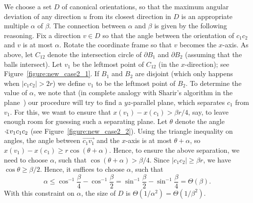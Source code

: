 \documentclass[a4paper,12pt]{article}
\def\bd{{\partial}}
\begin{document}
\smallskip
{} We
choose a set $D$ of canonical orientations, so that the maximum
angular deviation of any direction $u$ from its closest direction in
$D$ is an appropriate multiple $\alpha$ of $\beta$. The connection
between $\alpha$ and $\beta$ is given by the following reasoning.
Fix a direction $v \in D$ so that the angle between the orientation
of $c_1 c_2$ and $v$ is at most $\alpha$. Rotate the coordinate
frame so that $v$ becomes the $x$-axis. As above, let $C_{12}$
denote the intersection circle of $\bd{B_1}$ and $\bd{B_2}$
(assuming that the balls intersect). Let $v_1$ be the leftmost point
of $C_{12}$ (in the $x$-direction); see
Figure~\ref{figure:new_case2_1}. If $B_1$ and $B_2$ are disjoint
(which only happens when $|c_1 c_2| > 2r$) we define $v_1$ to be the
leftmost point of $B_2$. To determine the value of $\alpha$, we note
that (in complete analogy with Sharir's algorithm in the
plane~\cite{MS}) our procedure will try to find a $yz$-parallel
plane, which separates $c_1$ from $v_1$. For this, we want to ensure
that $x(v_1) - x(c_1) > \beta r/4$, say, to leave enough room for
guessing such a separating plane. Let $\theta$ denote the angle
$\varangle v_1c_1c_2$ (see Figure~\ref{figure:new_case2_2}). Using
the triangle inequality on angles, the angle between
$\overrightarrow{c_1 v_1}$ and the $x$-axis is at most $\theta +
\alpha$, so $x(v_1) - x(c_1) \geq r \cos(\theta + \alpha)$. Hence,
to ensure the above separation, we need to choose $\alpha$, such
that $\cos(\theta + \alpha) > \beta/4$. Since $|c_1 c_2| \geq \beta
r$, we have $\cos \theta \geq \beta/2$. Hence, it suffices to choose
$\alpha$, such that
$$\alpha \leq \cos^{-1} \frac{\beta}{4} - \cos^{-1} \frac{\beta}{2} =
    \sin^{-1} \frac{\beta}{2} - \sin^{-1} \frac{\beta}{4}
    = \Theta(\beta).$$
With this constraint on $\alpha$, the size of $D$ is
$\Theta\left(1/\alpha^2\right) = \Theta\left(1/\beta^2\right)$.
\end{document}
